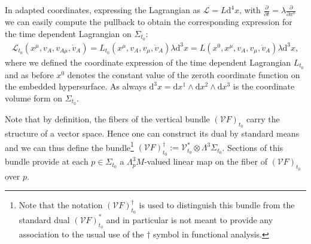 \documentclass[a4paper,12pt, DIV=14, BCOR=5mm, twoside, headsepline, numbers=noenddot]{scrbook}
\begin{document}
In adapted coordinates, expressing the Lagrangian as $\mathcal{L} = L \mathrm{d}^4x$, with $\frac{\partial}{\partial t} = \lambda \frac{\partial}{\partial x^0}$ we can easily compute the pullback to obtain the corresponding expression for the time dependent Lagrangian on $\Sigma_{t_0}$:
\begin{align}
    \mathcal{L}_{t_0}(x^{\mu}, v_A, v_{A{\mu}}, \dot{v}_A) = L_{t_0}(x^{\mu}, v_A, v_{\mu}, \dot{v}_A)\lambda \mathrm{d}^3x= L(x^0,x^{\mu}, v_A, v_{\mu}, \dot{v}_A)\lambda \mathrm{d}^3x,
\end{align}
where we defined the coordinate expression of the time dependent Lagrangian $L_{t_0}$ and as before $x^0$ denotes the constant value of the zeroth coordinate function on the embedded hypersurface. As always $\mathrm{d}^3x = \mathrm{d}x^1 \wedge \mathrm{d}x^2 \wedge \mathrm{d}x^3$ is the coordinate volume form on $\Sigma_{t_0}$.

Note that by definition, the fibers of the vertical bundle $(\mathcal{V}F)_{t_0}$ carry the structure of a vector space. 
Hence one can construct its dual by standard means and we can thus define the bundle\footnote{Note that the notation $(\mathcal{V}F)_{t_0}^{\dagger}$ is used to distinguish this bundle from the standard dual $(\mathcal{V}F)_{t_0}^{\ast}$ and in particular is not meant to provide any association to the usual use of the $\dagger$ symbol in functional analysis. } $(\mathcal{V}F)_{t_0}^{\dagger} := \mathcal{V}_{t_0}^{\ast} \otimes \Lambda^3\Sigma_{t_0}$. Sections of this bundle provide at each $p \in \Sigma_{t_0}$ a $\Lambda^3_pM$-valued linear map on the fiber of $(\mathcal{V}F)_{t_0}$ over $p$.
\end{document}
